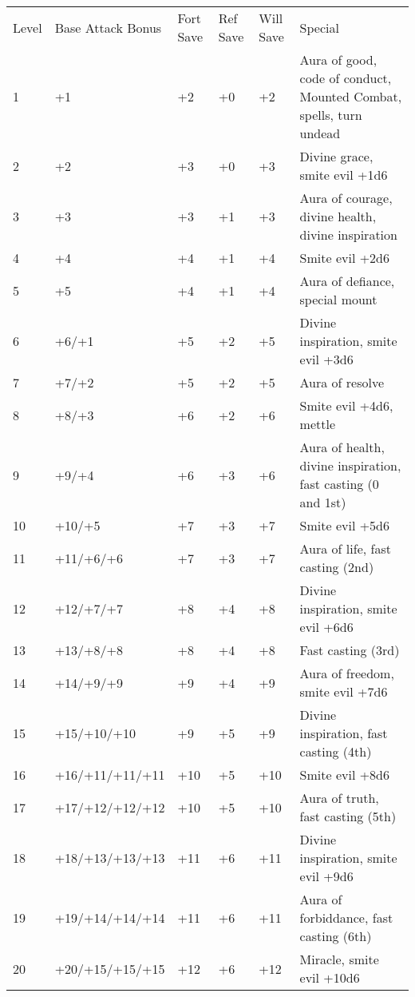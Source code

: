 \begin{table}[htb]
\begin{small}
\begin{tabular}{lp{3cm}p{0.7cm}p{0.7cm}p{0.7cm}l}
Level&Base Attack Bonus&Fort Save&Ref Save&Will Save&Special\\
1&+1&+2&+0&+2&Aura of good, code of conduct, Mounted Combat, spells, turn undead\\
2&+2&+3&+0&+3&Divine grace, smite evil +1d6\\
3&+3&+3&+1&+3&Aura of courage, divine health, divine inspiration\\
4&+4&+4&+1&+4&Smite evil +2d6\\
5&+5&+4&+1&+4&Aura of defiance, special mount\\
6&+6/+1&+5&+2&+5&Divine inspiration, smite evil +3d6\\
7&+7/+2&+5&+2&+5&Aura of resolve\\
8&+8/+3&+6&+2&+6&Smite evil +4d6, mettle\\
9&+9/+4&+6&+3&+6&Aura of health, divine inspiration, fast casting (0 and 1st)\\
10&+10/+5&+7&+3&+7&Smite evil +5d6\\
11&+11/+6/+6&+7&+3&+7&Aura of life, fast casting (2nd)\\
12&+12/+7/+7&+8&+4&+8&Divine inspiration, smite evil +6d6\\
13&+13/+8/+8&+8&+4&+8&Fast casting (3rd)\\
14&+14/+9/+9&+9&+4&+9&Aura of freedom, smite evil +7d6\\
15&+15/+10/+10&+9&+5&+9&Divine inspiration, fast casting (4th)\\
16&+16/+11/+11/+11&+10&+5&+10&Smite evil +8d6\\
17&+17/+12/+12/+12&+10&+5&+10&Aura of truth, fast casting (5th)\\
18&+18/+13/+13/+13&+11&+6&+11&Divine inspiration, smite evil +9d6\\
19&+19/+14/+14/+14&+11&+6&+11&Aura of forbiddance, fast casting (6th)\\
20&+20/+15/+15/+15&+12&+6&+12&Miracle, smite evil +10d6\\
\end{tabular}
\end{small}
\end{table}

